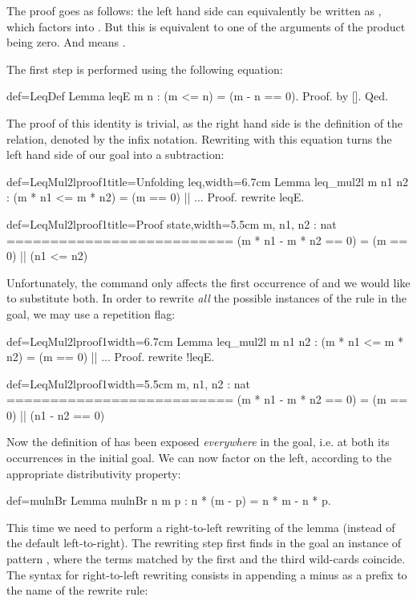 The proof goes as follows: the left
hand side can equivalently be written as , which
factors into . But this is equivalent to one
of the arguments of the product being zero. And 
means .

The first step is performed using the following equation:

\begin{coq}{def=LeqDef}{}
Lemma leqE m n : (m <= n) = (m - n == 0).
Proof. by []. Qed.
\end{coq}
The proof of this identity is trivial, as the right hand side is the
definition of the  relation, denoted by the \C{<=} infix
notation. Rewriting with this equation turns the left hand side of our
goal into a subtraction:

\begin{coq}{def=LeqMul2lproof1}{title=Unfolding leq,width=6.7cm}
Lemma leq_mul2l m n1 n2 :
 (m * n1 <= m * n2) = (m == 0) || ...
Proof.
rewrite leqE.
\end{coq}
\begin{coqout}{def=LeqMul2lproof1}{title=Proof state,width=5.5cm}
m, n1, n2 : nat
==========================
(m * n1 - m * n2 == 0) =
  (m == 0) || (n1 <= n2)
\end{coqout}
Unfortunately, the command  only affects the first
occurrence of \C{<=} and we would like to substitute both. In order to
rewrite \emph{all} the possible instances of the rule in the goal, we
may use a repetition flag:

\begin{coq}{def=LeqMul2lproof1}{width=6.7cm}
Lemma leq_mul2l m n1 n2 :
 (m * n1 <= m * n2) = (m == 0) || ...
Proof.
rewrite !leqE.
\end{coq}
\begin{coqout}{def=LeqMul2lproof1}{width=5.5cm}
m, n1, n2 : nat
==========================
(m * n1 - m * n2 == 0) =
  (m == 0) || (n1 - n2 == 0)
\end{coqout}

Now the definition of \C{<=} has been exposed
\emph{everywhere} in the goal, i.e. at both its occurrences in the
initial goal. We can now factor  on the left, according to the
appropriate distributivity property:

\begin{coq}{def=mulnBr}{}
Lemma mulnBr n m p : n * (m - p) = n * m - n * p.
\end{coq}
This time we need to perform a right-to-left rewriting of the
 lemma (instead of the
default left-to-right). The rewriting step first finds in the goal an
instance of pattern \C{(_ * _ - _ * _)}, where the terms matched by
the first and the third wild-cards coincide. The syntax for
right-to-left rewriting consists in appending a minus \C{-} as a
prefix to the name of the rewrite rule:


